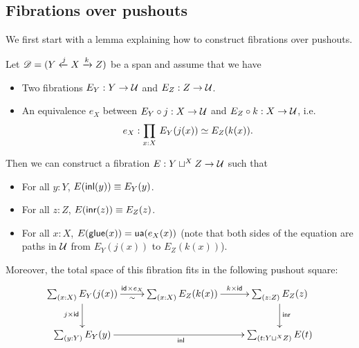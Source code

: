 \subsection{Fibrations over pushouts}
\label{sec:fib-over-pushout}

We first start with a lemma explaining how to construct fibrations over
pushouts.
%

\begin{lem}\label{lem:fibration-over-pushout}
  Let $\mathscr{D}=(Y\xleftarrow{j}X\xrightarrow{k}Z)$ be a span and assume
  that we have
  \begin{itemize}
  \item Two fibrations $E_Y:Y\to\mathcal{U}$ and $E_Z:Z\to\mathcal{U}$.
  \item An equivalence $e_X$ between $E_Y\circ j:X\to\mathcal{U}$ and $E_Z\circ
    k:X\to\mathcal{U}$, i.e.
    \[e_X:\prd{x:X}\eqv{E_Y(j(x))}{E_Z(k(x))}.\]
  \end{itemize}

  Then we can construct a fibration $E:Y\sqcup^XZ\to\mathcal{U}$ such that
  \begin{itemize}
  \item For all $y:Y$, $E({\mathsf{inl}}(y))\equiv E_Y(y)$.
  \item For all $z:Z$, $E({\mathsf{inr}}(z))\equiv E_Z(z)$.
  \item For all $x:X$, ${E}\mathopen{}\left({\mathsf{glue}(x)}\right)\mathclose{}=\mathsf{ua}(e_X(x))$ (note that both sides of
    the equation are paths in $\mathcal{U}$ from $E_Y(j(x))$ to $E_Z(k(x))$).
  \end{itemize}
  Moreover, the total space of this fibration fits in the following pushout
  square:
  \[\xymatrix{ \sm{x:X}E_Y(j(x)) \ar[r]_\sim^{\idfunc\times e_X}
    \ar[d]_{j\times\idfunc} &
    \sm{x:X}E_Z(k(x)) \ar[r]^-{k\times\idfunc}
    & \sm{z:Z}E_Z(z) \ar[d]^\inr \\
    \sm{y:Y}E_Y(y) \ar[rr]_\inl & & \sm{t:Y\sqcup^XZ}E(t) }\]
\end{lem}

